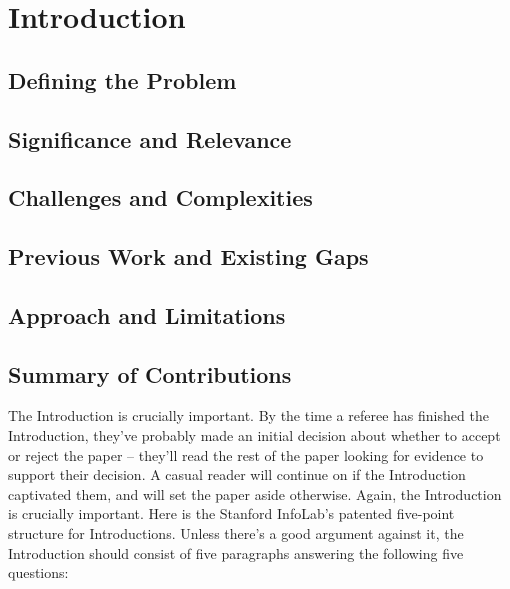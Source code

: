 \section{Introduction}

\subsection{Defining the Problem}

\subsection{Significance and Relevance}

\subsection{Challenges and Complexities}

\subsection{Previous Work and Existing Gaps}

\subsection{Approach and Limitations}

\subsection{Summary of Contributions}

The Introduction is crucially important. By the time a referee has finished the Introduction, they've probably made an initial decision about whether to accept or reject the paper -- they'll read the rest of the paper looking for evidence to support their decision. A casual reader will continue on if the Introduction captivated them, and will set the paper aside otherwise. Again, the Introduction is crucially important.
Here is the Stanford InfoLab's patented five-point structure for Introductions. Unless there's a good argument against it, the Introduction should consist of five paragraphs answering the following five questions:

